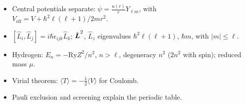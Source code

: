 \begin{fact}
\leavevmode
\begin{itemize}
\item Central potentials separate: $\psi = \frac{u(r)}{r}Y_{\ell m}$, with $V_{\text{eff}} = V + \hbar^2\ell(\ell+1)/2mr^2$.
\item $[\hat{L}_i,\hat{L}_j] = i\hbar\epsilon_{ijk}\hat{L}_k$; $\hat{\vect{L}}^2$, $\hat{L}_z$ eigenvalues $\hbar^2\ell(\ell+1)$, $\hbar m$, with $|m|\le\ell$.
\item Hydrogen: $E_n = -\text{Ry}Z^2/n^2$, $n>\ell$, degeneracy $n^2$ ($2n^2$ with spin); reduced mass $\mu$.
\item Virial theorem: $\langle T\rangle = -\frac12\langle V\rangle$ for Coulomb.
\item Pauli exclusion and screening explain the periodic table.
\end{itemize}
\end{fact}
